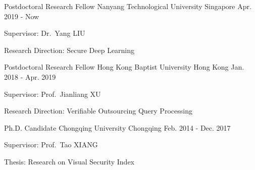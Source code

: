

\begin{cventries}
    \cventry%
    {Postdoctoral Research Fellow}
    {Nanyang Technological University}
    {Singapore}
    {Apr. 2019 - Now} %
    {
        \begin{cvitems}
            \item{Supervisor: Dr.\ Yang LIU}
            \item{Research Direction: Secure Deep Learning}
        \end{cvitems}
    }
    \cventry%
    {Postdoctoral Research Fellow}
    {Hong Kong Baptist University}
    {Hong Kong}
    {Jan. 2018 - Apr. 2019} %
    {
        \begin{cvitems}
            \item{Supervisor: Prof.\ Jianliang XU}
            \item{Research Direction: Verifiable Outsourcing Query Processing}
        \end{cvitems}
    }
	\cventry%
	{Ph.D. Candidate}
	{Chongqing University}
	{Chongqing}
	{Feb. 2014 - Dec. 2017} %
	{
		\begin{cvitems}
			\item{Supervisor: Prof.\ Tao XIANG}
			\item{Thesis: Research on Visual Security Index}
		\end{cvitems}
	}
\end{cventries}
\vspace{-0.2cm}
